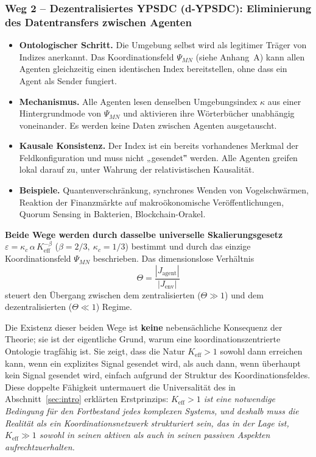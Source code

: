 \documentclass[12pt,a4paper]{article}
\begin{document}
	\subsubsection*{Weg 2 – Dezentralisiertes YPSDC (d‑YPSDC): Eliminierung des Datentransfers zwischen Agenten}
	\begin{itemize}[leftmargin=*]
		\item \textbf{Ontologischer Schritt.} Die Umgebung selbst wird als
		legitimer Träger von Indizes anerkannt. Das Koordinationsfeld \(\Psi_{MN}\) (siehe
		Anhang~A) kann allen Agenten gleichzeitig einen identischen Index bereitstellen,
		ohne dass ein Agent als Sender fungiert.
		\item \textbf{Mechanismus.} Alle Agenten lesen denselben Umgebungsindex
		\(\kappa\) aus einer Hintergrundmode von \(\Psi_{MN}\) und aktivieren ihre
		Wörterbücher unabhängig voneinander. Es werden keine Daten zwischen Agenten ausgetauscht.
		\item \textbf{Kausale Konsistenz.} Der Index ist ein bereits vorhandenes Merkmal der
		Feldkonfiguration und muss nicht „gesendet‟ werden. Alle Agenten greifen
		lokal darauf zu, unter Wahrung der relativistischen Kausalität.
		\item \textbf{Beispiele.} Quantenverschränkung, synchrones Wenden von
		Vogelschwärmen, Reaktion der Finanzmärkte auf makroökonomische Veröffentlichungen, Quorum
		Sensing in Bakterien, Blockchain-Orakel.
	\end{itemize}
	
	\medskip
	\noindent
	\textbf{Beide Wege werden durch dasselbe universelle Skalierungsgesetz}
	\(\varepsilon = \kappa_c\,\alpha\,K_{\mathrm{eff}}^{-\beta}\)
	(\(\beta = 2/3,\ \kappa_c = 1/3\)) bestimmt und durch das einzige
	Koordinationsfeld \(\Psi_{MN}\) beschrieben. Das dimensionslose Verhältnis
	\[
	\Theta = \frac{|J_{\mathrm{agent}}|}{|J_{\mathrm{env}}|}
	\]
	steuert den Übergang zwischen dem zentralisierten (\(\Theta \gg 1\)) und dem
	dezentralisierten (\(\Theta \ll 1\)) Regime.
	
	Die Existenz dieser beiden Wege ist \textbf{keine} nebensächliche Konsequenz der
	Theorie; sie ist der eigentliche Grund, warum eine koordinationszentrierte Ontologie
	tragfähig ist. Sie zeigt, dass die Natur \(K_{\mathrm{eff}} > 1\) sowohl dann erreichen kann, wenn
	ein explizites Signal gesendet wird, als auch dann, wenn überhaupt kein Signal gesendet wird, einfach
	aufgrund der Struktur des Koordinationsfeldes. Diese doppelte Fähigkeit
	untermauert die Universalität des in Abschnitt~\ref{sec:intro} erklärten Erstprinzips: \emph{\(K_{\mathrm{eff}} > 1\) ist eine notwendige
		Bedingung für den Fortbestand jedes komplexen Systems, und deshalb muss die Realität
		als ein Koordinationsnetzwerk strukturiert sein, das in der Lage ist,
		\(K_{\mathrm{eff}} \gg 1\) sowohl in seinen aktiven als auch in seinen passiven Aspekten aufrechtzuerhalten.}
	
\end{document}
